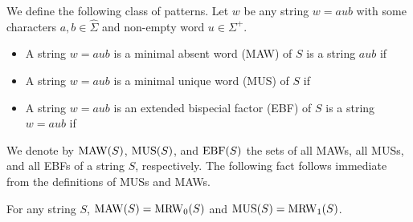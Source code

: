 \begin{definition}
  We define the following class of patterns.
  Let $w$ be any string $w = a u b$ with some characters $a, b\in \hat\Sigma$ and non-empty word $u \in \Sigma^+$. 
  \begin{itemize}
  \item A string $w = a u b$ is a minimal absent word (MAW) of $S$ is a string $a u b$ if 

  \item A string $w = a u b$ is a minimal unique word (MUS) of $S$ if 

  \item A string $w = a u b$ is an extended bispecial factor (EBF) of $S$ is a string $w = a u b$ if 

\end{itemize}
\end{definition}

We denote by $\mathrm{MAW}(S)$, $\mathrm{MUS}(S)$, and $\mathrm{EBF}(S)$ the sets of all MAWs, all MUSs, and all EBFs of a string $S$, respectively.
The following fact follows immediate from the definitions of MUSs and MAWs.

\begin{lemma}
  For any string $S$,
  $\mathrm{MAW}(S) = \mathrm{MRW}_0(S)$ and 
  $\mathrm{MUS}(S) = \mathrm{MRW}_1(S)$. 
\end{lemma}

